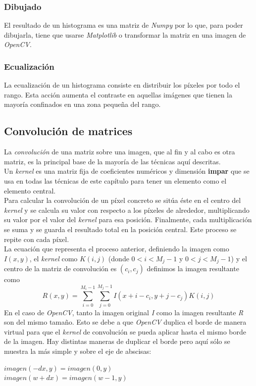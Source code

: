 \subsubsection{Dibujado}
El resultado de un histograma es una matriz de \emph{Numpy} por lo
que, para poder dibujarla, tiene que usarse \emph{Matplotlib} o
transformar la matriz en una imagen de \emph{OpenCV}.

\subsubsection{Ecualización}
La ecualización de un histograma consiste en distribuir los píxeles
por todo el rango. Esta acción aumenta el contraste en aquellas
imágenes que tienen la mayoría confinados en una zona pequeña del
rango.

\subsection{Convolución de matrices}
La \emph{convolución} de una matriz sobre una imagen, que al fin y al
cabo es otra matriz, es la principal base de la mayoría de las
técnicas aquí descritas. \\
Un \emph{kernel} es una matriz fija de coeficientes numéricos y
dimensión \textbf{impar} que se usa en todas las técnicas de este
capítulo
para tener un elemento como el elemento central. \\
Para calcular la convolución de un píxel concreto se sitúa éste en el
centro del \emph{kernel} y se calcula su valor con respecto a los
píxeles de alrededor, multiplicando su valor por el valor del
\emph{kernel} para esa posición. Finalmente, cada multiplicación se
suma y se guarda el resultado total en la posición central. Este
proceso se repite con cada píxel. \\
La ecuación que representa el proceso anterior, definiendo la imagen
como $I(x, y)$, el \emph{kernel} como $K(i, j)$ (donde
$0 < i < M_j - 1$ y $0 < j < M_j - 1$) y el centro de la matriz de
convolución es $(c_i, c_j)$ definimos la imagen resultante como
\begin{equation*}
  R(x, y) = \sum_{i=0}^{M_i-1} \sum_{j=0}^{M_j-1}  I(x + i - c_i, y + j - c_j)K(i,j)
\end{equation*}
En el caso de \emph{OpenCV}, tanto la imagen original \emph{I} como la
imagen resultante \emph{R} son del mismo tamaño. Esto se debe a que
\emph{OpenCV} duplica el borde de manera virtual para que el
\emph{kernel} de convolución se pueda aplicar hasta el mismo borde de
la imagen. Hay distintas maneras de duplicar el borde pero aquí sólo
se muestra la más simple y sobre el eje de abscisas:
\begin{center}
  $imagen(-dx, y) = imagen(0, y)$
  \\
  $imagen(w + dx) = imagen(w - 1, y)$
\end{center}


